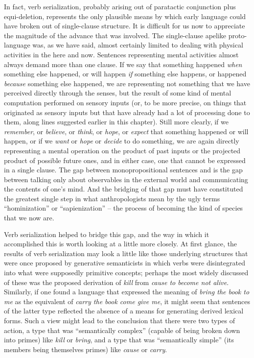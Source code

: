 In fact, verb serialization, probably arising out of paratactic conjunction plus equi-deletion, represents the only plausible means by which early language could have broken out of single-clause structure. It is difficult for us now to appreciate the magnitude of the advance that was involved. The single-clause apelike proto-language was, as we have said, almost certainly limited to dealing with physical activities in the here and now. Sentences representing mental activities almost always demand more than one clause. If we say that something happened \textit{when} something else happened, or will happen \textit{if} something else happens, or happened \textit{because} something else happened, we are representing not something that we have perceived directly through the senses, but the result of some kind of mental computation performed
on sensory inputs (or, to be more precise, on things that originated as sensory inputs but that have already had a lot of processing done to them, along lines suggested earlier in this chapter). Still more clearly, if we \textit{remember}, or \textit{believe}, or \textit{think}, or \textit{hope}, or \textit{expect} that something happened or will happen, or if we \textit{want} or \textit{hope} or \textit{decide} to do some\-thing, we are again directly representing a mental operation on the product of past inputs or the projected product of possible future ones, and in either case, one that cannot be expressed in a single clause. The gap between monopropositional sentences and  is the gap between talking only about observables in the external world and communicating the contents of one's mind. And the bridging of that gap must have constituted the greatest single step in what anthropologists mean by the ugly terms ``hominization'' or ``sapienization'' -- the process of becoming the kind of species that we now are.

Verb serialization helped to bridge this gap, and the way in which it accomplished this is worth looking at a little more closely. At first glance, the results of verb serialization may look a little like those underlying structures that were once proposed by generative semanticists in which verbs were disintegrated into what were supposedly primitive concepts; perhaps the most widely discussed of these was the proposed derivation of \textit{kill} from \textit{cause to become not alive}. Similarly, if one found a language that expressed the meaning of \textit{bring the book to me} as the equivalent of \textit{carry the book come give me}, it might seem that sentences of the latter type reflected the absence of a means for generating derived lexical forms. Such a view might lead to the conclusion that there were two types of action, a type that was ``semantically complex'' (capable of being broken down into primes) like \textit{kill} or \textit{bring}, and a type that was ``semantically simple'' (its members being themselves primes) like \textit{cause} or \textit{carry}.

